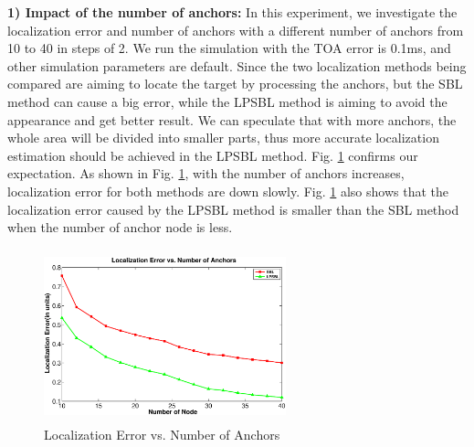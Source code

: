 \textbf{1) Impact of the number of anchors:}
 In this experiment, we investigate the localization error and number of anchors with a different number of anchors from 10 to 40 in steps of 2. 
 We run the simulation with the TOA error is 0.1ms, and other simulation parameters are default. 
 Since the two localization methods being compared are aiming to locate the target by processing the anchors, 
 but the SBL method can cause a big error, while the LPSBL method is aiming to avoid the appearance and get better result. 
 We can speculate that with more anchors, the whole area will be divided into smaller parts, 
 thus more accurate localization estimation should be achieved in the LPSBL method. 
Fig. \ref{fig4} confirms our expectation. As shown in Fig. \ref{fig4}, with the number of anchors increases, localization error for both  methods are down slowly. 
Fig. \ref{fig4} also shows that the localization error caused by the LPSBL method is smaller than the SBL method when the number of anchor node is less.
  \begin{figure}[htb]
            \setlength{\abovecaptionskip}{0pt}
			 \vspace{-15mm}
           		 \includegraphics[height=5.0cm,width=7.0cm]{image/fig4.eps}
            \vspace{15mm}
            \caption{Localization Error vs. Number of Anchors}
             \vspace{-7mm}
             \label{fig4}
        \end{figure}	
		
